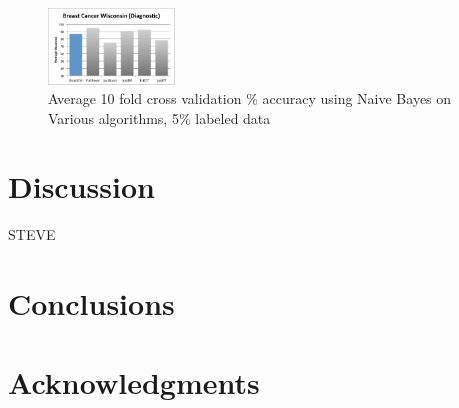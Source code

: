\documentclass{sig-alternate}
\begin{document}
\begin{figure}
\centering
\includegraphics[width=0.3\textwidth]{figures/breaAcc5.pdf}
\caption{Average 10 fold cross validation \% accuracy using Naive Bayes on Various algorithms, 5\% labeled data}
\label{vertAcc}
\end{figure}

\section{Discussion}
STEVE 
\section{Conclusions}
\section{Acknowledgments}


\end{document}
